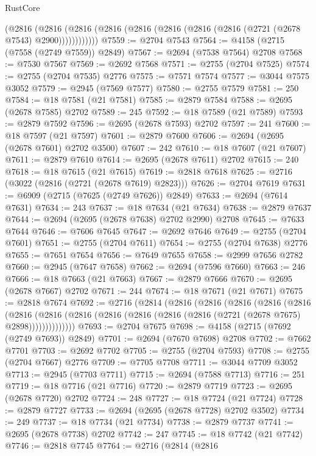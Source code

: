 \begin{lexlean}{RustCore}
\begin{coremodule}
          (@2816
            (@2816 (@2816 (@2816 (@2816 (@2816 (@2816 (@2816 (@2721 (@2678 @7543) @2900))))))))))))
@7559 := @2704 @7543
@7564 := @4158 (@2715 (@7558 (@2749 @7559)) @2849)
@7567 := @2694 (@7538 @7564) @2708
@7568 := @7530 @7567
@7569 := @2692 @7568
@7571 := @2755 (@2704 @7525)
@7574 := @2755 (@2704 @7535) @2776
@7575 := @7571 @7574
@7577 := @3044 @7575 @3052
@7579 := @2945 (@7569 @7577)
@7580 := @2755 @7579
@7581 := 250
@7584 := @18 @7581 (@21 @7581)
@7585 := @2879 @7584
@7588 := @2695 (@2678 @7585) @2702
@7589 := 245
@7592 := @18 @7589 (@21 @7589)
@7593 := @2879 @7592
@7596 := @2695 (@2678 @7593) @2702
@7597 := 241
@7600 := @18 @7597 (@21 @7597)
@7601 := @2879 @7600
@7606 := @2694 (@2695 (@2678 @7601) @2702 @3500)
@7607 := 242
@7610 := @18 @7607 (@21 @7607)
@7611 := @2879 @7610
@7614 := @2695 (@2678 @7611) @2702
@7615 := 240
@7618 := @18 @7615 (@21 @7615)
@7619 := @2818 @7618
@7625 := @2716 (@3022 (@2816 (@2721 (@2678 @7619) @2823)))
@7626 := @2704 @7619
@7631 := @6909 (@2715 (@7625 (@2749 @7626)) @2849)
@7633 := @2694 (@7614 @7631)
@7634 := 243
@7637 := @18 @7634 (@21 @7634)
@7638 := @2879 @7637
@7644 := @2694 (@2695 (@2678 @7638) @2702 @2990) @2708
@7645 := @7633 @7644
@7646 := @7606 @7645
@7647 := @2692 @7646
@7649 := @2755 (@2704 @7601)
@7651 := @2755 (@2704 @7611)
@7654 := @2755 (@2704 @7638) @2776
@7655 := @7651 @7654
@7656 := @7649 @7655
@7658 := @2999 @7656 @2782
@7660 := @2945 (@7647 @7658)
@7662 := @2694 (@7596 @7660)
@7663 := 246
@7666 := @18 @7663 (@21 @7663)
@7667 := @2879 @7666
@7670 := @2695 (@2678 @7667) @2702
@7671 := 244
@7674 := @18 @7671 (@21 @7671)
@7675 := @2818 @7674
@7692 := @2716
    (@2814
      (@2816
        (@2816
          (@2816
            (@2816
              (@2816
                (@2816
                  (@2816 (@2816 (@2816 (@2816 (@2816 (@2816 (@2721 (@2678 @7675) @2898))))))))))))))
@7693 := @2704 @7675
@7698 := @4158 (@2715 (@7692 (@2749 @7693)) @2849)
@7701 := @2694 (@7670 @7698) @2708
@7702 := @7662 @7701
@7703 := @2692 @7702
@7705 := @2755 (@2704 @7593)
@7708 := @2755 (@2704 @7667) @2776
@7709 := @7705 @7708
@7711 := @3044 @7709 @3052
@7713 := @2945 (@7703 @7711)
@7715 := @2694 (@7588 @7713)
@7716 := 251
@7719 := @18 @7716 (@21 @7716)
@7720 := @2879 @7719
@7723 := @2695 (@2678 @7720) @2702
@7724 := 248
@7727 := @18 @7724 (@21 @7724)
@7728 := @2879 @7727
@7733 := @2694 (@2695 (@2678 @7728) @2702 @3502)
@7734 := 249
@7737 := @18 @7734 (@21 @7734)
@7738 := @2879 @7737
@7741 := @2695 (@2678 @7738) @2702
@7742 := 247
@7745 := @18 @7742 (@21 @7742)
@7746 := @2818 @7745
@7764 := @2716
    (@2814
      (@2816

\end{coremodule}
\end{lexlean}
